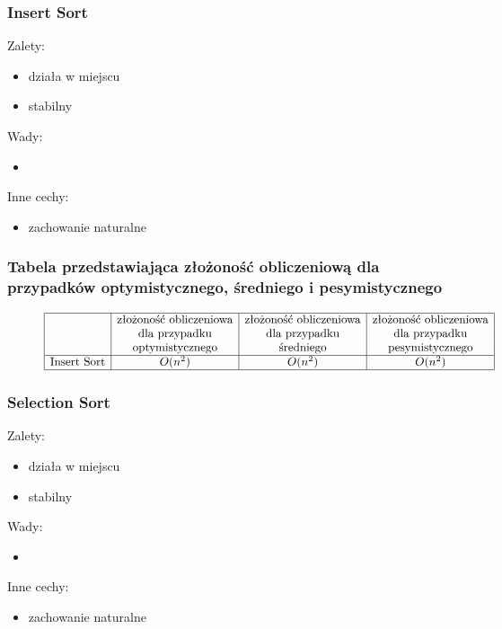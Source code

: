 \documentclass[polish,polish,a4paper]{article}
\begin{document}
\begin{spacing}{1.5}
	\subsubsection*{Insert Sort}
	Zalety:
	\begin{itemize}
		\item działa w miejscu
		\item stabilny 
	\end{itemize}
	Wady:
	\begin{itemize}
		\item 
	\end{itemize}
	Inne cechy:
	\begin{itemize}
		\item zachowanie naturalne
	\end{itemize}
	
				\subsubsection*{Tabela przedstawiająca złożoność obliczeniową dla przypadków optymistycznego, średniego i pesymistycznego} 
	
	\begin{figure}[H]
		\begin{equation*}
		\begin{array}{|l|c|c|c|}
		\hline
		&$złożoność obliczeniowa$&$złożoność obliczeniowa$&$złożoność obliczeniowa$\\
		&$dla przypadku$&$dla przypadku$&$dla przypadku$\\
		&$optymistycznego$&$średniego$&$pesymistycznego$\\
		\hline
		$Insert Sort$&O(n^2)&O(n^2)&O(n^2)\\
		\hline
		\end{array}
		\end{equation*}
	\end{figure}
		
		\subsubsection*{Selection Sort}
	Zalety:
	\begin{itemize}
		\item działa w miejscu
		\item stabilny 
	\end{itemize}
	Wady:
	\begin{itemize}
		\item 
	\end{itemize}
	Inne cechy:
	\begin{itemize}
		\item zachowanie naturalne
	\end{itemize}
	

\end{spacing}
\end{document}
